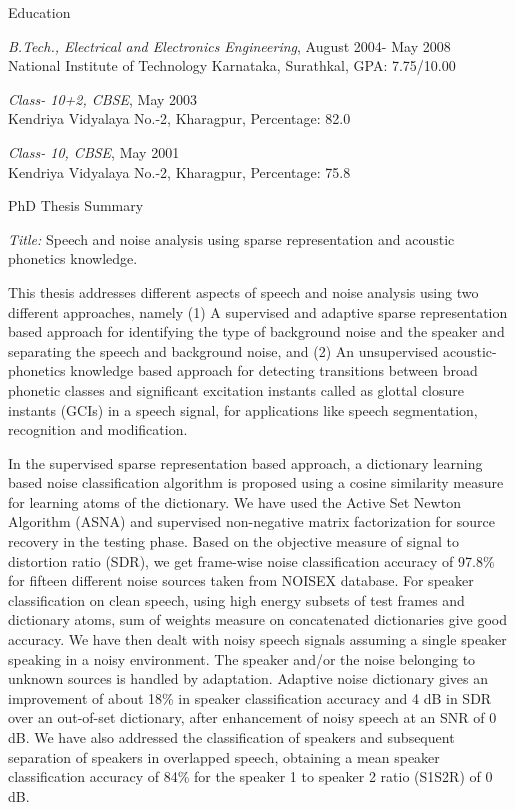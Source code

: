 \documentclass[10pt]{article}
\newenvironment{subbulletlist}{%
	\begin{list}{\labelitemii}{%
		\setlength{\topsep}{\itemsep}\setlength{\parskip}{\parsep}%
	}%
}%
{ \end{list} }
\begin{document}
\begin{cv}
\begin{cvlist}{Education}
\begin{subbulletlist}
	\end{subbulletlist}
	\item \emph{B.Tech., Electrical and Electronics Engineering}, August 2004- May 2008\\
	National Institute of Technology Karnataka, Surathkal, GPA: 7.75/10.00
	\item \emph{Class- 10+2, CBSE}, May 2003 \\
	Kendriya Vidyalaya No.-2, Kharagpur, Percentage: 82.0
	\item \emph{Class- 10, CBSE}, May 2001 \\
	Kendriya Vidyalaya No.-2, Kharagpur, Percentage: 75.8
\end{cvlist}



\begin{cvlist}{PhD Thesis Summary}
\item
\textit{Title:} Speech and noise analysis using sparse representation and acoustic phonetics knowledge.
  
  This thesis  addresses  different  aspects of speech and noise analysis using two different approaches, namely (1) A supervised and adaptive sparse representation based approach for identifying the type of background noise and the speaker and separating the speech and background noise, and (2) An unsupervised acoustic-phonetics knowledge  based approach for detecting transitions between broad phonetic classes  and significant excitation instants called as glottal closure instants (GCIs) in a speech signal, for applications like speech segmentation, recognition and modification.  
    	 
    	
    	In the supervised sparse representation based approach, a dictionary
    	learning based noise classification algorithm is proposed using a cosine
    	similarity measure for learning atoms of the dictionary. We have used the
    	Active Set Newton Algorithm (ASNA) and supervised non-negative matrix factorization  for source recovery in the testing
    	phase. Based on the objective measure of signal to distortion ratio (SDR),
     we get frame-wise noise  classification accuracy of 97.8\% for fifteen different noise sources taken from NOISEX database.
    	For speaker classification on clean speech,  using  high energy subsets of test frames and dictionary atoms, sum of weights measure on concatenated dictionaries give good accuracy. 
    	 	We have then dealt with  noisy speech signals assuming a single speaker speaking in a noisy environment. The speaker and/or  the noise   belonging to unknown sources is handled by adaptation. Adaptive noise dictionary gives an
    	 	    	improvement of about 18\% in speaker classification accuracy and  4 dB in SDR over an out-of-set dictionary, after
    	 	    	enhancement of noisy speech at an SNR of 0 dB.
    	 	    	  	  We have also addressed the classification of speakers and subsequent separation of speakers in  overlapped speech, obtaining a  mean speaker classification accuracy of 84\% for the  speaker 1 to speaker 2 ratio (S1S2R) of 0 dB.
    	 	

\end{cvlist}
\end{cv}
\end{document}
